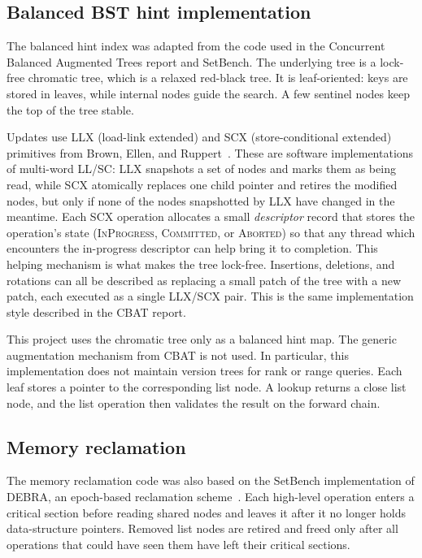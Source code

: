 \documentclass[a4paper,11pt]{article}
\begin{document}
\subsection{Balanced BST hint implementation}

The balanced hint index was adapted from the code used in the Concurrent Balanced Augmented Trees report and SetBench. The underlying tree is a lock-free chromatic tree, which is a relaxed red-black tree. It is leaf-oriented: keys are stored in leaves, while internal nodes guide the search. A few sentinel nodes keep the top of the tree stable.

Updates use LLX (load-link extended) and SCX (store-conditional extended) primitives from Brown, Ellen, and Ruppert~\cite{brown2014general}. These are software implementations of multi-word LL/SC: LLX snapshots a set of nodes and marks them as being read, while SCX atomically replaces one child pointer and retires the modified nodes, but only if none of the nodes snapshotted by LLX have changed in the meantime. Each SCX operation allocates a small \emph{descriptor} record that stores the operation's state (\textsc{InProgress}, \textsc{Committed}, or \textsc{Aborted}) so that any thread which encounters the in-progress descriptor can help bring it to completion. This helping mechanism is what makes the tree lock-free. Insertions, deletions, and rotations can all be described as replacing a small patch of the tree with a new patch, each executed as a single LLX/SCX pair. This is the same implementation style described in the CBAT report.

This project uses the chromatic tree only as a balanced hint map. The generic augmentation mechanism from CBAT is not used. In particular, this implementation does not maintain version trees for rank or range queries. Each leaf stores a pointer to the corresponding list node. A lookup returns a close list node, and the list operation then validates the result on the forward chain.

\subsection{Memory reclamation}

The memory reclamation code was also based on the SetBench implementation of DEBRA, an epoch-based reclamation scheme~\cite{brown2015debra,brown2020setbench}. Each high-level operation enters a critical section before reading shared nodes and leaves it after it no longer holds data-structure pointers. Removed list nodes are retired and freed only after all operations that could have seen them have left their critical sections.
\end{document}
